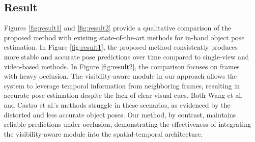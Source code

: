 \subsection{Result}

Figures \ref{fig:result1} and \ref{fig:result2} provide a qualitative comparison of the proposed method with existing state-of-the-art methods for in-hand object pose estimation. In Figure \ref{fig:result1}, the proposed method consistently produces more stable and accurate pose predictions over time compared to single-view and video-based methods. In Figure \ref{fig:result2}, the comparison focuses on frames with heavy occlusion. The visibility-aware module in our approach allows the system to leverage temporal information from neighboring frames, resulting in accurate pose estimation despite the lack of clear visual cues. Both Wang et al. and Castro et al.'s methods struggle in these scenarios, as evidenced by the distorted and less accurate object poses. Our method, by contrast, maintains reliable predictions under occlusion, demonstrating the effectiveness of integrating the visibility-aware module into the spatial-temporal architecture.

